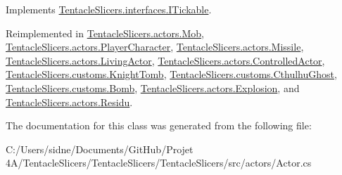 Implements \hyperlink{interface_tentacle_slicers_1_1interfaces_1_1_i_tickable}{Tentacle\+Slicers.\+interfaces.\+I\+Tickable}.



Reimplemented in \hyperlink{class_tentacle_slicers_1_1actors_1_1_mob_ad3e79cfdf2a28f8eb6363f0567bdcaaf}{Tentacle\+Slicers.\+actors.\+Mob}, \hyperlink{class_tentacle_slicers_1_1actors_1_1_player_character_ae5043ba6bbb1d2007f0f29f61e28369c}{Tentacle\+Slicers.\+actors.\+Player\+Character}, \hyperlink{class_tentacle_slicers_1_1actors_1_1_missile_ad07d0a9fe7aa8abce9aa5df78ebbb8be}{Tentacle\+Slicers.\+actors.\+Missile}, \hyperlink{class_tentacle_slicers_1_1actors_1_1_living_actor_a1697e3d67782b4df99e48a333a138935}{Tentacle\+Slicers.\+actors.\+Living\+Actor}, \hyperlink{class_tentacle_slicers_1_1actors_1_1_controlled_actor_aa66cbbda81610ee2610e540e59725a39}{Tentacle\+Slicers.\+actors.\+Controlled\+Actor}, \hyperlink{class_tentacle_slicers_1_1customs_1_1_knight_tomb_a2494934e67c63f70623b7ff47a4248f8}{Tentacle\+Slicers.\+customs.\+Knight\+Tomb}, \hyperlink{class_tentacle_slicers_1_1customs_1_1_cthulhu_ghost_a402aea79e343f8f5a1b153a143edf9fb}{Tentacle\+Slicers.\+customs.\+Cthulhu\+Ghost}, \hyperlink{class_tentacle_slicers_1_1customs_1_1_bomb_aefe2c2dcf1c3159e161f781c4d0d08d7}{Tentacle\+Slicers.\+customs.\+Bomb}, \hyperlink{class_tentacle_slicers_1_1actors_1_1_explosion_aeae36dfeadd7f8b7ec6a278ab4fae019}{Tentacle\+Slicers.\+actors.\+Explosion}, and \hyperlink{class_tentacle_slicers_1_1actors_1_1_residu_a429af1b4c0a6bdbb4cb2e42a1f3ba571}{Tentacle\+Slicers.\+actors.\+Residu}.



The documentation for this class was generated from the following file\+:\begin{DoxyCompactItemize}
\item 
C\+:/\+Users/sidne/\+Documents/\+Git\+Hub/\+Projet 4\+A/\+Tentacle\+Slicers/\+Tentacle\+Slicers/\+Tentacle\+Slicers/src/actors/Actor.\+cs\end{DoxyCompactItemize}
